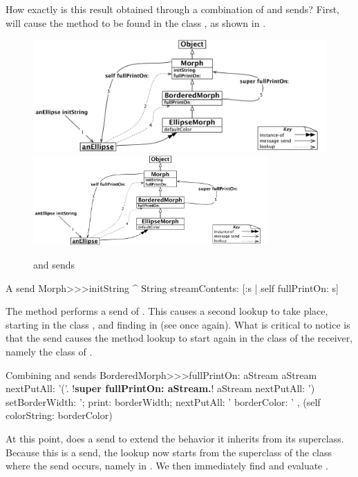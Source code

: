 \documentclass[a4paper,10pt,twoside]{book}
\begin{document}
How exactly is this result obtained through a combination of \self and \super sends?
First,  will cause the method  to be found in the class ,
as shown in .

\begin{figure}[htb]
\begin{center}
\ifluluelse
	{\includegraphics[width=\textwidth]{initStringLookup}}
	{\includegraphics[width=0.8\textwidth]{initStringLookup}}
\caption{\self and \super sends\label{fig:initStringLookup}}
\end{center}
\end{figure}

\begin{method}[initString]{A \self send}
Morph>>>initString
	^ String streamContents: [:s | self fullPrintOn: s]
\end{method}
The method  performs a \self send of .
This causes a second lookup to take place, starting in the class , and finding  in  (see  once again).
What is critical to notice is that the \self send causes the method lookup to start again in the class of the receiver, namely the class of .


\begin{method}[fullPrintOn]{Combining \super and \self sends}
BorderedMorph>>>fullPrintOn: aStream
	aStream nextPutAll: '('.
	!\textbf{super fullPrintOn: aStream.}!
	aStream nextPutAll: ') setBorderWidth: '; print: borderWidth;
		nextPutAll: ' borderColor: ' , (self colorString: borderColor)
\end{method}
At this point,  does a \super send to extend the behavior it inherits from its superclass.
Because this is a \super send, the lookup now starts from the superclass of the class where the \super send occurs, namely in .
We then immediately find and evaluate .
\end{document}
